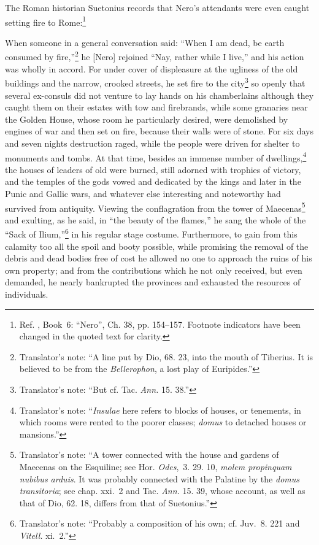 \documentclass[letterpaper,12pt]{article}
\newenvironment{squote}
  {\small\quote}
  {\endquote\normalsize}
\newenvironment{squotation}
  {\small\quotation}
  {\endquotation\normalsize}
\begin{document}
The Roman historian Suetonius records that Nero's attendants were even caught setting fire to Rome:\footnote{Ref. , Book~6: ``Nero'', Ch. 38, pp. 154--157. Footnote indicators have been changed in the quoted text for clarity.}

\begin{squotation}
When someone in a general conversation said: \begin{squote}
``When I am dead, be earth consumed by fire,''\footnote{Translator's note: ``A line put by Dio, 68. 23, into the mouth of Tiberius. It is believed to be from the \emph{Bellerophon}, a lost play of Euripides.''}
\end{squote} he [Nero] rejoined ``Nay, rather while I live,'' and his action was wholly in accord. For under cover of displeasure at the ugliness of the old buildings and the narrow, crooked streets, he set fire to the city\footnote{Translator's note: ``But cf. Tac. \emph{Ann.} 15. 38.''} so openly that several ex-consuls did not venture to lay hands on his chamberlains although they caught them on their estates with tow and firebrands, while some granaries near the Golden House, whose room he particularly desired, were demolished by engines of war and then set on fire, because their walls were of stone. For six days and seven nights destruction raged, while the people were driven for shelter to monuments and tombs. At that time, besides an immense number of dwellings,\footnote{Translator's note: ``\emph{Insulae} here refers to blocks of houses, or tenements, in which rooms were rented to the poorer classes; \emph{domus} to detached houses or mansions.''} the houses of leaders of old were burned, still adorned with trophies of victory, and the temples of the gods vowed and dedicated by the kings and later in the Punic and Gallic wars, and whatever else interesting and noteworthy had survived from antiquity. Viewing the conflagration from the tower of Maecenas\footnote{Translator's note: ``A tower connected with the house and gardens of Maecenas on the Esquiline; see Hor. \emph{Odes},~3. 29. 10, \emph{molem propinquam nubibus arduis}. It was probably connected with the Palatine by the \emph{domus transitoria}; see chap. xxi.~2 and Tac. \emph{Ann.} 15. 39, whose account, as well as that of Dio, 62. 18, differs from that of Suetonius.''} and exulting, as he said, in ``the beauty of the flames,'' he sang the whole of the ``Sack of Ilium,''\footnote{Translator's note: ``Probably a composition of his own; cf. Juv.~8. 221 and \emph{Vitell.} xi.~2.''} in his regular stage costume. Furthermore, to gain from this calamity too all the spoil and booty possible, while promising the removal of the debris and dead bodies free of cost he allowed no one to approach the ruins of his own property; and from the contributions which he not only received, but even demanded, he nearly bankrupted the provinces and exhausted the resources of individuals.
\end{squotation}
\end{document}

